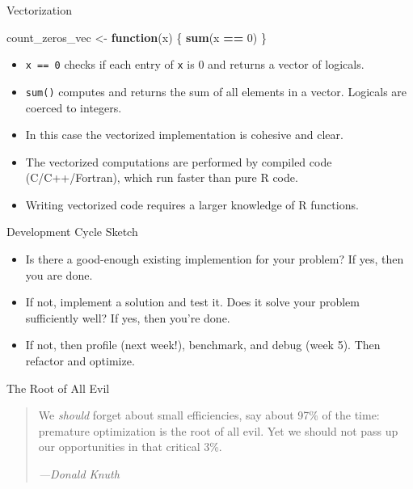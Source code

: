 \documentclass[
  ignorenonframetext,
  aspectratio=1610,
  onlytextwidth]{beamer}
\newenvironment{Shaded}{\begin{snugshade}}{\end{snugshade}}
\newcommand{\ControlFlowTok}[1]{\textcolor[rgb]{0.13,0.29,0.53}{\textbf{#1}}}
\newcommand{\DecValTok}[1]{\textcolor[rgb]{0.00,0.00,0.81}{#1}}
\newcommand{\FunctionTok}[1]{\textcolor[rgb]{0.13,0.29,0.53}{\textbf{#1}}}
\newcommand{\NormalTok}[1]{#1}
\newcommand{\OtherTok}[1]{\textcolor[rgb]{0.56,0.35,0.01}{#1}}
\newcommand{\SpecialCharTok}[1]{\textcolor[rgb]{0.81,0.36,0.00}{\textbf{#1}}}
\providecommand{\tightlist}{}
\begin{document}
\begin{frame}[fragile]{Vectorization}
\label{vectorization}
\begin{Shaded}
\begin{Highlighting}[]
\NormalTok{count\_zeros\_vec }\OtherTok{\textless{}{-}} \ControlFlowTok{function}\NormalTok{(x) \{}
  \FunctionTok{sum}\NormalTok{(x }\SpecialCharTok{==} \DecValTok{0}\NormalTok{)}
\NormalTok{\}}
\end{Highlighting}
\end{Shaded}

\pause

\begin{itemize}[<+->]
\tightlist
\item
  \texttt{x\ ==\ 0} checks if each entry of \texttt{x} is 0 and returns
  a vector of logicals.
\item
  \texttt{sum()} computes and returns the sum of all elements in a
  vector. Logicals are coerced to integers.
\item
  In this case the vectorized implementation is cohesive and clear.
\item
  The vectorized computations are performed by compiled code
  (C/C++/Fortran), which run faster than pure R code.
\item
  Writing vectorized code requires a larger knowledge of R functions.
\end{itemize}
\end{frame}

\begin{frame}{Development Cycle Sketch}
\label{development-cycle-sketch}
\begin{itemize}[<+->]
\tightlist
\item
  Is there a good-enough existing implemention for your problem? If yes,
  then you are done.
\item
  If not, implement a solution and test it. Does it solve your problem
  sufficiently well? If yes, then you're done.
\item
  If not, then profile (next week!), benchmark, and debug (week 5). Then
  refactor and optimize.
\end{itemize}

\pause

\begin{block}{The Root of All Evil}
\label{the-root-of-all-evil}
\medskip

\begin{quote}
We \emph{should} forget about small efficiencies, say about 97\% of the
time: premature optimization is the root of all evil. Yet we should not
pass up our opportunities in that critical 3\%.

\emph{---Donald Knuth}
\end{quote}
\end{block}
\end{frame}
\end{document}
